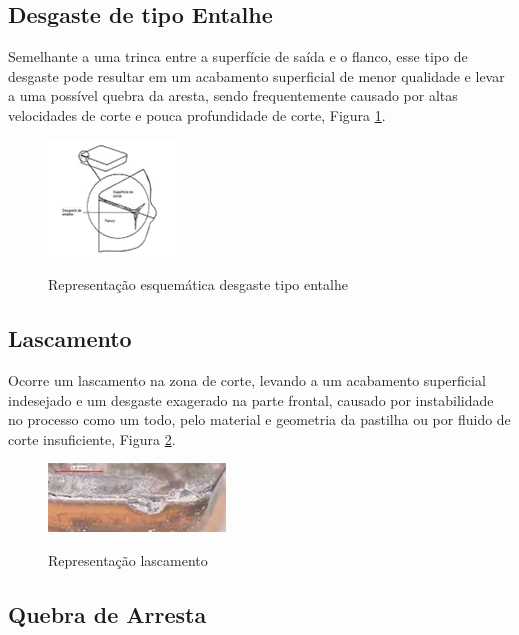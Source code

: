 \documentclass[deposito, acronym, symbols]{fei}
\begin{document}
\subsection{Desgaste de tipo Entalhe}

Semelhante a uma trinca entre a superfície de saída e o flanco, esse tipo de desgaste pode resultar em um acabamento superficial de menor qualidade e levar a uma possível quebra da aresta, sendo frequentemente causado por altas velocidades de corte e pouca profundidade de corte, Figura \ref{fig:entalhe}.

 \begin{figure}[!htb]
 \centering
    \caption{Representação esquemática desgaste tipo entalhe}
    \includegraphics[width=0.3\linewidth]{Imagens/Exp03_Desgastetipoentalhe.png}
    \label{fig:entalhe}
 \end{figure}

\subsection{Lascamento}

Ocorre um lascamento na zona de corte, levando a um acabamento superficial indesejado e um desgaste exagerado na parte frontal, causado por instabilidade no processo como um todo, pelo material e geometria da pastilha ou por fluido de corte insuficiente, Figura \ref{fig:lascamento}.

\begin{figure}[!htb]
 \centering
    \caption{Representação lascamento}
    \includegraphics[width=0.4\linewidth]{Imagens/Exp03_Lascamento.png}
    \label{fig:lascamento}
 \end{figure}

\subsection{Quebra de Arresta}
\end{document}
